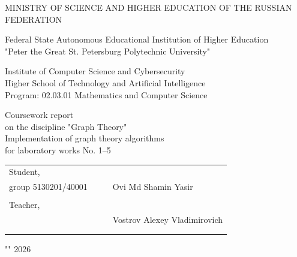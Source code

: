 \documentclass[a4paper,final]{article}
\begin{document}
	\begin{center}
		\normalsize\bf{{MINISTRY OF SCIENCE AND HIGHER EDUCATION OF THE RUSSIAN FEDERATION}

			\hfill \break
			Federal State Autonomous Educational Institution of Higher Education\\ "Peter the Great St. Petersburg Polytechnic University"\\[10pt]}
		\hfill \break
		\normalsize{Institute of Computer Science and Cybersecurity}\\[10pt]

		\normalsize{Higher School of Technology and Artificial Intelligence}\\[10pt]

		\normalsize{Program: 02.03.01 Mathematics and Computer Science}\\
		\vspace{50pt}

		\vspace{1pt}
		\begin{center}
Coursework report\\
on the discipline "Graph Theory"\\
Implementation of graph theory algorithms\\
for laboratory works No. 1--5

		\end{center}

		\hfill \break
		\hfill \break
	\end{center}
	\small{ \bf
		\begin{tabular}{lrrl}
			\!\!\!Student, & \hspace{0cm} & & \\
			\!\!\!group 5130201/40001 & \hspace{1.5cm} & \underline{\hspace{3cm}} & \hspace{-0.3cm}Ovi Md Shamin Yasir  \\\\
			\!\!\!Teacher, & \hspace{1cm} & \\
			\!\!\! & \hspace{0.1cm} & \underline{\hspace{3cm}} &  Vostrov Alexey Vladimirovich\\\\
			&&\hspace{3.5cm}
		\end{tabular}
		\begin{flushright}
			"\underline{\hspace{1cm}}"\underline{\hspace{2.5cm}} 2026
		\end{flushright}
	}
\end{document}
